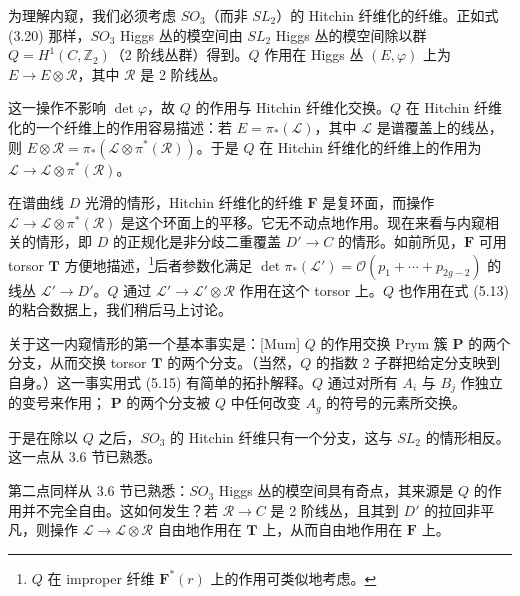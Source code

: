 \documentclass[11pt,a4paper]{article}
\begin{document}
为理解内窥，我们必须考虑 $SO_3$（而非 $SL_2$）的 Hitchin 纤维化的纤维。正如式 (3.20) 那样，$SO_3$ Higgs 丛的模空间由 $SL_2$ Higgs 丛的模空间除以群 $Q = H^1(C,\mathbb{Z}_2)$（2 阶线丛群）得到。$Q$ 作用在 Higgs 丛 $(E,\varphi)$ 上为 $E\to E\otimes\mathcal{R}$，其中 $\mathcal{R}$ 是 2 阶线丛。

这一操作不影响 $\det\varphi$，故 $Q$ 的作用与 Hitchin 纤维化交换。$Q$ 在 Hitchin 纤维化的一个纤维上的作用容易描述：若 $E = \pi_*(\mathcal{L})$，其中 $\mathcal{L}$ 是谱覆盖上的线丛，则 $E\otimes\mathcal{R} = \pi_*(\mathcal{L}\otimes\pi^*(\mathcal{R}))$。于是 $Q$ 在 Hitchin 纤维化的纤维上的作用为 $\mathcal{L}\to\mathcal{L}\otimes\pi^*(\mathcal{R})$。

在谱曲线 $D$ 光滑的情形，Hitchin 纤维化的纤维 $\boldsymbol{F}$ 是复环面，而操作 $\mathcal{L}\to\mathcal{L}\otimes\pi^*(\mathcal{R})$ 是这个环面上的平移。它无不动点地作用。现在来看与内窥相关的情形，即 $D$ 的正规化是非分歧二重覆盖 $D'\to C$ 的情形。如前所见，$\boldsymbol{F}$ 可用 torsor $\boldsymbol{T}$ 方便地描述，\footnote{$Q$ 在 improper 纤维 $\boldsymbol{F}^*(r)$ 上的作用可类似地考虑。}后者参数化满足 $\det\pi_*(\mathcal{L}') = \mathcal{O}(p_1+\cdots+p_{2g-2})$ 的线丛 $\mathcal{L}'\to D'$。$Q$ 通过 $\mathcal{L}'\to\mathcal{L}'\otimes\mathcal{R}$ 作用在这个 torsor 上。$Q$ 也作用在式 (5.13) 的粘合数据上，我们稍后马上讨论。

关于这一内窥情形的第一个基本事实是：[Mum] $Q$ 的作用交换 Prym 簇 $\boldsymbol{P}$ 的两个分支，从而交换 torsor $\boldsymbol{T}$ 的两个分支。（当然，$Q$ 的指数 2 子群把给定分支映到自身。）这一事实用式 (5.15) 有简单的拓扑解释。$Q$ 通过对所有 $A_i$ 与 $B_j$ 作独立的变号来作用；
$\boldsymbol{P}$ 的两个分支被 $Q$ 中任何改变 $A_g$ 的符号的元素所交换。

于是在除以 $Q$ 之后，$SO_3$ 的 Hitchin 纤维只有一个分支，这与 $SL_2$ 的情形相反。这一点从 3.6 节已熟悉。

第二点同样从 3.6 节已熟悉：$SO_3$ Higgs 丛的模空间具有奇点，其来源是 $Q$ 的作用并不完全自由。这如何发生？若 $\mathcal{R}\to C$ 是 2 阶线丛，且其到 $D'$ 的拉回非平凡，则操作 $\mathcal{L}\to\mathcal{L}\otimes\mathcal{R}$ 自由地作用在 $\boldsymbol{T}$ 上，从而自由地作用在 $\boldsymbol{F}$ 上。
\end{document}
